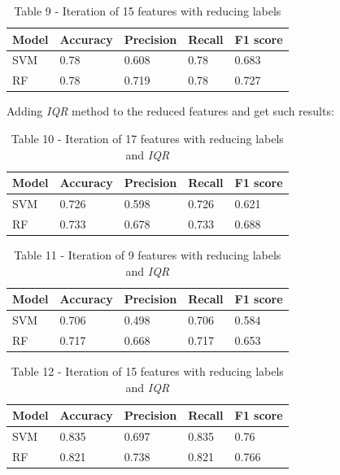 \begin{table}[H]
\caption*{Table 9 - Iteration of 15 features with reducing labels}
\centering
\begin{tabular}{|l|l|l|l|l|}
\hline
Model & Accuracy & Precision & Recall & F1 score \\ \hline
SVM   & 0.78     & 0.608     & 0.78   & 0.683    \\ \hline
RF    & 0.78     & 0.719     & 0.78   & 0.727    \\ \hline
\end{tabular}
\end{table}

Adding \emph{IQR} method to the reduced features and get such results:


\begin{table}[H]
\caption*{Table 10 - Iteration of 17 features with reducing labels and \emph{IQR}}
\centering
\begin{tabular}{|l|l|l|l|l|}
\hline
Model & Accuracy & Precision & Recall & F1 score \\ \hline
SVM   & 0.726    & 0.598     & 0.726  & 0.621    \\ \hline
RF    & 0.733    & 0.678     & 0.733  & 0.688    \\ \hline
\end{tabular}
\end{table}


\begin{table}[H]
\caption*{Table 11 - Iteration of 9 features with reducing labels and \emph{IQR}}
\centering
\begin{tabular}{|l|l|l|l|l|}
\hline
Model & Accuracy & Precision & Recall & F1 score \\ \hline
SVM   & 0.706    & 0.498     & 0.706  & 0.584    \\ \hline
RF    & 0.717    & 0.668     & 0.717  & 0.653    \\ \hline
\end{tabular}
\end{table}


\begin{table}[H]
\caption*{Table 12 - Iteration of 15 features with reducing labels and
\emph{IQR}}
\centering
\begin{tabular}{|l|l|l|l|l|}
\hline
Model & Accuracy & Precision & Recall & F1 score \\ \hline
SVM   & 0.835    & 0.697     & 0.835  & 0.76     \\ \hline
RF    & 0.821    & 0.738     & 0.821  & 0.766    \\ \hline
\end{tabular}
\end{table}

